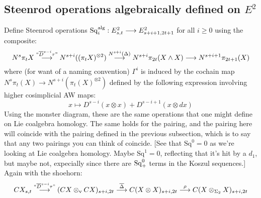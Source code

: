 \documentclass[10pt]{article}
\newcommand{\SqShift}{\Sq_{\smash{+}}}
\newcommand{\Sq}{\mathrm{Sq}}
\begin{document}
\begin{Adams sseq operations old version}
\subsection{Steenrod operations algebraically defined on $E^2$}
Define Steenrod operations $\Sq^\textup{alg}_i:E^2_{s,t}\to E^2_{s+i+1,2t+1}$ for all $i\geq 0$ using the composite:
\[N^s\pi_tX\overset{\textup{``}\overline{D}^{s-i}\circ\tau\textup{''}}{\to}N^{s+i}((\pi_tX)^{\otimes2})\overset{N^{s+i}(\Delta)}{\to}N^{s+i}\pi_{2t}(X\wedge X)\to N^{s+i+1}\pi_{2t+1}(X)\]
where (for want of a naming convention) $\Gamma^i$ is induced by the cochain map $N^s\pi_t(X)\to N^{s+i}(\pi_t(X)^{\otimes 2})$ defined by the following expression involving higher cosimplicial AW maps:
\[x\mapsto D^{s-i}(x\otimes x)+D^{s-i+1}(x\otimes dx)\]
Using the monster diagram, these are the same operations that one might define on Lie coalgebra homology. The same holds for the pairing, and the pairing here will coincide with the pairing defined in the previous subsection, which is to say that any two pairings you can think of coincide.
[{See that $\Sq^0=0$ as we're looking at Lie coalgebra homology.} Maybe $\Sq^1=0$, reflecting that it's hit by a $d_1$, but maybe not, expecially since there are $\SqShift^0$ terms in the Koszul sequences.]
Again with the shoehorn:
\[CX_{s,t}\overset{\textup{``}\overline{D}^{s-i}\circ\tau\textup{''}}{\to} (CX\otimes_\textup{v}CX)_{s+i,2t} \overset{\overline{\Delta}}{\to}C(X\otimes X)_{s+i,2t}\overset{\rho}{\to}C(X\otimes_{\Sigma_2} X)_{s+i,2t}\]


\end{Adams sseq operations old version}
\end{document}
